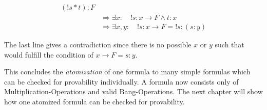 \begin{equation}\label{bb}
\begin{split}
	(!s*t):F  \\
	& \Rightarrow \exists x : \quad !s: x \rightarrow F \land t: x\\
	& \Rightarrow \exists x,y : \quad !s: x \rightarrow F = !s:(s:y)
\end{split}
\end{equation}

The last line gives a contradiction since there is no possible $x$ or $y$ such that would fulfill the condition of $x \rightarrow F = s:y$.



\par
This concludes the \emph{atomization} of one formula to many simple formulas which can be checked for provability individually. A formula now consists only of Multiplication-Operations and valid Bang-Operations. The next chapter will show how one atomized formula can be checked for provability.

